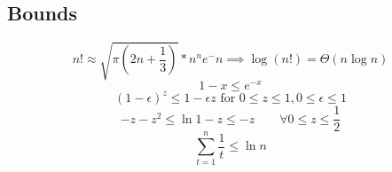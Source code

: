 \documentclass{article}
\begin{document}
\subsection*{Bounds}
$$n! \approx \sqrt{\pi(2n+\frac{1}{3})} * n^n e^-n \implies \log(n!)=\Theta(n\log n)$$
$$1 - x \leq e^{-x}$$
$$(1-\epsilon)^z \leq 1-\epsilon z \text{ for } 0 \leq z\leq 1, 0\leq\epsilon\leq 1$$
$$-z-z^2 \leq \ln 1-z \leq -z \qquad \forall 0 \leq z \leq \frac{1}{2}$$
$$\sum_{t=1}^n{\frac{1}{t}} \leq \ln n$$
\end{document}
